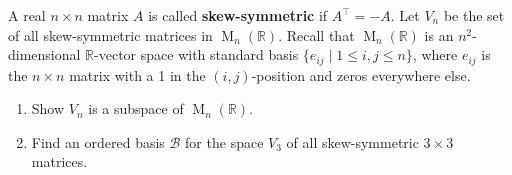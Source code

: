\documentclass[11pt,twoside,openany]{memoir}
\begin{document}
        \begin{exercise}
        A real $n \times n$ matrix $A$ is called \textbf{skew-symmetric} if $A^\top = -A$. Let $V_n$ be the set of all skew-symmetric matrices in $\operatorname{M}_n(\mathbb{R})$. Recall that $\operatorname{M}_n(\mathbb{R})$ is an $n^2$-dimensional $\mathbb{R}$-vector space with standard basis $\{ e_{ij} \mid 1 \le i,j \le n\}$, where $e_{ij}$ is the $n \times n$ matrix with a 1 in the $(i,j)$-position and zeros everywhere else.
        \begin{enumerate}[label=(\alph*)]
            \item Show $V_n$ is a subspace of $\operatorname{M}_n(\mathbb{R})$.
            \item Find an ordered basis $\mathcal{B}$ for the space $V_3$ of all skew-symmetric $3 \times 3$ matrices.
        \end{enumerate}
        \end{exercise}

\newpage
\end{document}
